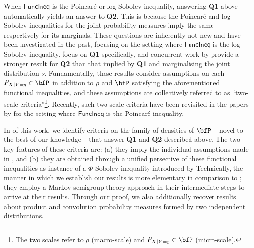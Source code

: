 \documentclass[11pt]{article}
\newcounter{ct}
\newcommand{\FuncIneq}{\mathsf{FuncIneq}}
\begin{document}
When \(\FuncIneq{}\) is the Poincar\'{e} or log-Sobolev inequality, answering \textbf{Q1} above automatically yields an answer to \textbf{Q2}.
This is because the Poincar\'{e} and log-Sobolev inequalities for the joint probability measures imply the same respectively for its marginals.
These questions are inherently not new and have been investigated in the past, focusing on the setting where \(\FuncIneq{}\) is the log-Sobolev inequality.
\citet{blower2005concentration,grunewald2009two} focus on \textbf{Q1} specifically, and concurrent work by \citet{otto2007new} provide a stronger result for \textbf{Q2} than that implied by \textbf{Q1} and marginalising the joint distribution \(\nu\).
Fundamentally, these results consider assumptions on each \(P_{X | Y = y} \in \bfP\) in addition to \(\rho\) and \(\bfP\) satisfying the aforementioned functional inequalities, and these assumptions are collectively referred to as ``two-scale criteria''\footnote{The two scales refer to \(\rho\) (macro-scale) and \(P_{X | Y = y} \in \bfP\) (micro-scale).}.
Recently, such two-scale criteria have been revisited in the papers by \citet{mou2019sampling,ge2020simulated} for the setting where \(\FuncIneq{}\) is the Poincar\'{e} inequality.

In  of this work, we identify criteria on the family of densities of \(\bfP\) -- novel to the best of our knowledge -- that answer \textbf{Q1} and \textbf{Q2} described above.
The two key features of these criteria are: (a) they imply the individual assumptions made in \citet{otto2007new,mou2019sampling,ge2020simulated}, and (b) they are obtained through a unified persective of these functional inequalities as instance of a \(\Phi\)-Sobolev inequality introduced by \citet{chafai2004entropies}
Technically, the manner in which we establish our results is more elementary in comparison to \citet{otto2007new}; they employ a Markov semigroup theory approach in their intermediate steps to arrive at their results.
Through our proof, we also additionally recover results about product and convolution probability measures formed by two independent distributions.
\end{document}
